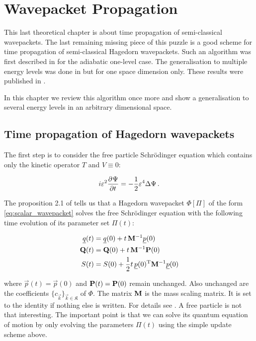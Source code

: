 \chapter{Wavepacket Propagation}
\label{ch:wavepacket_propagation}


This last theoretical chapter is about time propagation of semi-classical
wavepackets. The last remaining missing piece of this puzzle is a good scheme
for time propagation of semi-classical Hagedorn wavepackets. Such an algorithm was
first described in \cite{FGL_semiclassical_dynamics} for the adiabatic one-level
case. The generalisation to multiple energy levels was done in \cite{B_bachelor_thesis}
but for one space dimension only. These results were published in \cite{BGH_nonadibatic_algorithms}.

In this chapter we review this algorithm once more and show a generalisation
to several energy levels in an arbitrary dimensional space.


\section{Time propagation of Hagedorn wavepackets}


The first step is to consider the free particle Schrödinger equation which
contains only the kinetic operator $T$ and $V \equiv 0$:

\begin{equation*}
  i \varepsilon^2  \frac{\partial^{}\Psi}{\partial t^{}} = -\frac{1}{2} \varepsilon^4 \Delta \Psi \,.
\end{equation*}

The proposition 2.1 of \cite{FGL_semiclassical_dynamics} tells us that a Hagedorn wavepacket
$\Phi[\Pi]$ of the form \eqref{eq:scalar_wavepacket} solves the free Schrödinger
equation with the following time evolution of its parameter set $\Pi(t)$:

\begin{equation} \label{eq:update_scheme_kin}
\begin{split}
  \underline{q}(t) & = \underline{q}(0) + t \, \mathbf{M}{}^{-1} \underline{p}(0) \\
  \mathbf{Q}(t) & = \mathbf{Q}(0) + t \, \mathbf{M}{}^{-1} \mathbf{P}(0) \\
  S(t) & = S(0) + \frac{1}{2}t \, \underline{p}(0){}^{\textnormal{T}} \mathbf{M}{}^{-1} \underline{p}(0)
\end{split}
\end{equation}

where $\vec{p}(t) = \vec{p}(0)$ and $\mathbf{P}(t) = \mathbf{P}(0)$ remain unchanged.
Also unchanged are the coefficients $\{c_{\vec{k}}\}_{\vec{k} \in \mathfrak{K}}$
of $\Phi$. The matrix $\mathbf{M}$ is the mass scaling matrix. It is set to the
identity if nothing else is written. For details see \cite[equation 2.8]{FGL_semiclassical_dynamics}.
A free particle is not that interesting. The important point is that we can
solve its quantum equation of motion by only evolving the parameters $\Pi(t)$
using the simple update scheme above.


